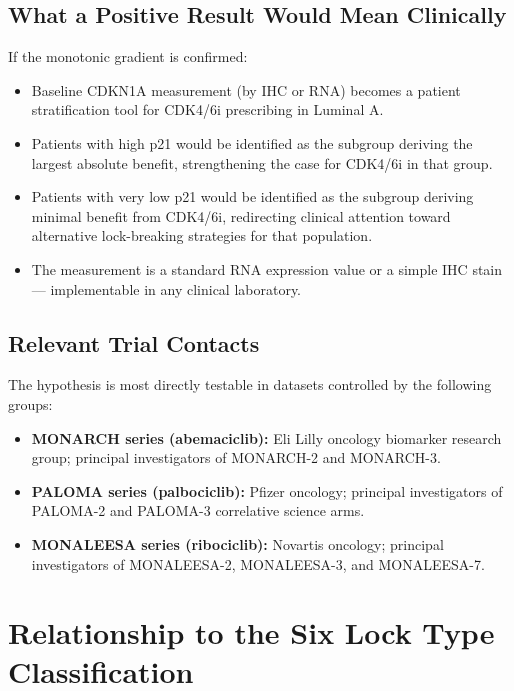 \documentclass[12pt, a4paper]{article}
\begin{document}
\subsection{What a Positive Result Would Mean Clinically}

If the monotonic gradient is confirmed:

\begin{itemize}
    \item Baseline CDKN1A measurement (by IHC or RNA)
    becomes a patient stratification tool for CDK4/6i
    prescribing in Luminal A.
    \item Patients with high p21 would be identified as
    the subgroup deriving the largest absolute benefit,
    strengthening the case for CDK4/6i in that group.
    \item Patients with very low p21 would be identified
    as the subgroup deriving minimal benefit from CDK4/6i,
    redirecting clinical attention toward alternative
    lock-breaking strategies for that population.
    \item The measurement is a standard RNA expression
    value or a simple IHC stain --- implementable in any
    clinical laboratory.
\end{itemize}

\subsection{Relevant Trial Contacts}

The hypothesis is most directly testable in datasets
controlled by the following groups:

\begin{itemize}
    \item \textbf{MONARCH series (abemaciclib):}
    Eli Lilly oncology biomarker research group;
    principal investigators of MONARCH-2 and MONARCH-3.
    \item \textbf{PALOMA series (palbociclib):}
    Pfizer oncology; principal investigators of
    PALOMA-2 and PALOMA-3 correlative science arms.
    \item \textbf{MONALEESA series (ribociclib):}
    Novartis oncology; principal investigators of
    MONALEESA-2, MONALEESA-3, and MONALEESA-7.
\end{itemize}

\section{Relationship to the Six Lock Type Classification}
\end{document}
